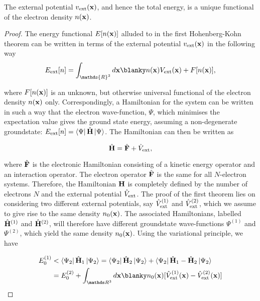 \documentclass{homework}
\begin{document}
\begin{theo}
The external potential $v_{\textnormal{ext}}({\bf x})$, and hence the total energy, is a unique functional of the electron density $n({\bf x})$.
\end{theo}

\begin{proof}
The energy functional $E[n({\bf x})]$ alluded to in the first Hohenberg-Kohn theorem can be written in terms of the external potential $v_{\textnormal{ext}}({\bf x})$ in the following way 
\begin{equation}
    E_{\textnormal{ext}}[n] = \int_{\mathds{R}^3} d{\bf x}  \blanky n({\bf x}) V_{\textnormal{ext}}({\bf x}) + F[n({\bf x})],
\end{equation}

where $F[n({\bf x})]$ is an unknown, but otherwise universal functional of the electron density $n({\bf x})$ only. Correspondingly, a Hamiltonian for the system can be written in such a way that the electron wave-function, $\Psi$, which minimises the expectation value gives the ground state energy, assuming a non-degenerate groundstate: $E_{\textnormal{ext}}[n] = \bra{\Psi}\hat{\bf H}\ket{\Psi}$. 
The Hamiltonian can then be written as 

$$
\hat{\bf H} = \hat{\bf F} + \hat{V}_{\textnormal{ext}},
$$

where $\hat{\bf F}$ is the electronic Hamiltonian consisting of a kinetic energy operator and an interaction operator. The electron operator $\hat{\bf F}$ is the same for all $N$-electron systems. Therefore, the Hamiltonian ${\bf H}$ is completely defined by the number of electrons $N$ and the external potential $\hat{V}_{\textnormal{ext}}$. The proof of the first theorem lies on considering two different external potentials, say $\hat{V}^{(1)}_{\textnormal{ext}}$ and $\hat{V}^{(2)}_{\textnormal{ext}}$, which we assume to give rise to the same density $n_{0}({\bf x})$. The associated Hamiltonians, labelled $\hat{\bf H}^{(1)}$ and $\hat{\bf H}^{(2)}$, will therefore have different groundstate wave-functions ${\Psi}^{(1)}$ and ${\Psi}^{(2)}$, which yield the same density $n_{0}({\bf x})$. Using the variational principle, we have 

\begin{align}
    E_{0}^{(1)} &< \bra{\Psi_2} \hat{\bf H}_1 \ket{\Psi_2} = \bra{\Psi_2} \hat{\bf H}_2 \ket{\Psi_2} + \bra{\Psi_2} \hat{\bf H}_1-\hat{\bf H}_2 \ket{\Psi_2} \\
    &=  E_{0}^{(2)} + \int_{\R^3} d{\bf x} \blanky n_{0}({\bf x}) [\hat{V}^{(1)}_{\textnormal{ext}}({\bf x})-\hat{V}^{(2)}_{\textnormal{ext}}({\bf x})]
\end{align}


\end{proof}
\end{document}
